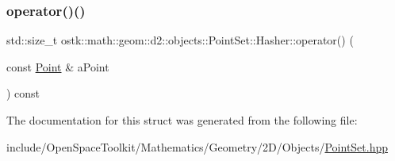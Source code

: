 \subsubsection{\texorpdfstring{operator()()}{operator()()}}
{\footnotesize\ttfamily std\+::size\+\_\+t ostk\+::math\+::geom\+::d2\+::objects\+::\+Point\+Set\+::\+Hasher\+::operator() (\begin{DoxyParamCaption}\item[{const \hyperlink{classostk_1_1math_1_1geom_1_1d2_1_1objects_1_1_point}{Point} \&}]{a\+Point }\end{DoxyParamCaption}) const\hspace{0.3cm}{\ttfamily [inline]}}



The documentation for this struct was generated from the following file\+:\begin{DoxyCompactItemize}
\item 
include/\+Open\+Space\+Toolkit/\+Mathematics/\+Geometry/2\+D/\+Objects/\hyperlink{2_d_2_objects_2_point_set_8hpp}{Point\+Set.\+hpp}\end{DoxyCompactItemize}
